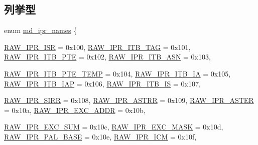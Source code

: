 \subsection*{列挙型}
\begin{DoxyCompactItemize}
\item 
enum \hyperlink{namespaceAlphaISA_a0cd208652efde0d49b6a875aea151470}{md\_\-ipr\_\-names} \{ \par
\hyperlink{namespaceAlphaISA_a0cd208652efde0d49b6a875aea151470a296206f00e119c65c195098b74b9ff40}{RAW\_\-IPR\_\-ISR} =  0x100, 
\hyperlink{namespaceAlphaISA_a0cd208652efde0d49b6a875aea151470ac57bbd72e5f9fa64347a0fee7fd818b6}{RAW\_\-IPR\_\-ITB\_\-TAG} =  0x101, 
\hyperlink{namespaceAlphaISA_a0cd208652efde0d49b6a875aea151470ad4d60cfe52d4092e11fd512b2ebd3299}{RAW\_\-IPR\_\-ITB\_\-PTE} =  0x102, 
\hyperlink{namespaceAlphaISA_a0cd208652efde0d49b6a875aea151470a91a0abbf9ce65ed8fc6bd33ea88cc05d}{RAW\_\-IPR\_\-ITB\_\-ASN} =  0x103, 
\par
\hyperlink{namespaceAlphaISA_a0cd208652efde0d49b6a875aea151470add9139d0b57b8e3de88b07dc61516ec4}{RAW\_\-IPR\_\-ITB\_\-PTE\_\-TEMP} =  0x104, 
\hyperlink{namespaceAlphaISA_a0cd208652efde0d49b6a875aea151470a87709ba87f9d94bc5558b8d3ecf0b357}{RAW\_\-IPR\_\-ITB\_\-IA} =  0x105, 
\hyperlink{namespaceAlphaISA_a0cd208652efde0d49b6a875aea151470aef7cee5902dee4de8f5677a4de87102a}{RAW\_\-IPR\_\-ITB\_\-IAP} =  0x106, 
\hyperlink{namespaceAlphaISA_a0cd208652efde0d49b6a875aea151470a273e176ded7378f82bdca1d7b3db457f}{RAW\_\-IPR\_\-ITB\_\-IS} =  0x107, 
\par
\hyperlink{namespaceAlphaISA_a0cd208652efde0d49b6a875aea151470a4404c9b05a6bfe2dcf0a25f824cc5521}{RAW\_\-IPR\_\-SIRR} =  0x108, 
\hyperlink{namespaceAlphaISA_a0cd208652efde0d49b6a875aea151470a659ea29c0241f78bc5c35827c597b8f4}{RAW\_\-IPR\_\-ASTRR} =  0x109, 
\hyperlink{namespaceAlphaISA_a0cd208652efde0d49b6a875aea151470a796aef08d2249f0e20615c0ec09c9d03}{RAW\_\-IPR\_\-ASTER} =  0x10a, 
\hyperlink{namespaceAlphaISA_a0cd208652efde0d49b6a875aea151470a80d1e79570f78965eef46523151266e2}{RAW\_\-IPR\_\-EXC\_\-ADDR} =  0x10b, 
\par
\hyperlink{namespaceAlphaISA_a0cd208652efde0d49b6a875aea151470adc1e6d6885805dd267ad216d1eaf9e58}{RAW\_\-IPR\_\-EXC\_\-SUM} =  0x10c, 
\hyperlink{namespaceAlphaISA_a0cd208652efde0d49b6a875aea151470a5c1150e225bdf6ad12cf93f63cb7e590}{RAW\_\-IPR\_\-EXC\_\-MASK} =  0x10d, 
\hyperlink{namespaceAlphaISA_a0cd208652efde0d49b6a875aea151470ad56ec04b2871be4fb9a5efe66b1c64e1}{RAW\_\-IPR\_\-PAL\_\-BASE} =  0x10e, 
\hyperlink{namespaceAlphaISA_a0cd208652efde0d49b6a875aea151470a9eceec308bb08c9317beb95bbca91f60}{RAW\_\-IPR\_\-ICM} =  0x10f, 

\end{DoxyCompactItemize}
